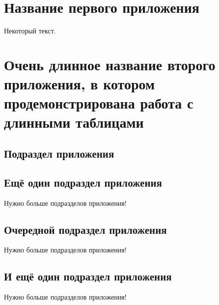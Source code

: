 \appendix
\chapter{Название первого приложения} \label{AppendixA}

Некоторый текст.

\chapter{Очень длинное название второго приложения, в котором продемонстрирована работа с длинными таблицами} \label{AppendixB}

\section{Подраздел приложения}\label{AppendixB1}

\fontsize{14pt}{15pt}\selectfont
\section{Ещё один подраздел приложения} \label{AppendixB2}

Нужно больше подразделов приложения!

\section{Очередной подраздел приложения} \label{AppendixB3}

Нужно больше подразделов приложения!

\section{И ещё один подраздел приложения} \label{AppendixB4}

Нужно больше подразделов приложения!

